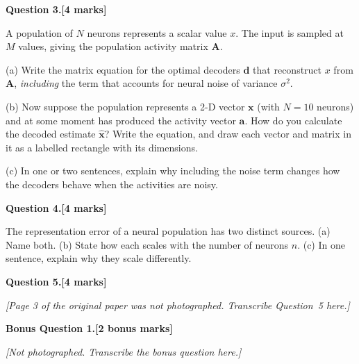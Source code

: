 \documentclass[11pt,letterpaper]{article}
\newcommand{\question}[2]{\par\vspace{10pt}\textbf{Question #1.}\hfill\textbf{[#2 marks]}\par}
\newcommand{\answerbox}[1]{\par\noindent\framebox[\linewidth]{\rule{0pt}{#1}}\par}
\begin{document}
\question{3}{4}
A population of $N$ neurons represents a scalar value $x$. The input is sampled at $M$ values, giving the population activity matrix $\mathbf{A}$.

(a) Write the matrix equation for the optimal decoders $\mathbf d$ that reconstruct $x$ from $\mathbf A$, \emph{including} the term that accounts for neural noise of variance $\sigma^2$.
\vspace{2.2cm}

(b) Now suppose the population represents a 2-D vector $\mathbf x$ (with $N = 10$ neurons) and at some moment has produced the activity vector $\mathbf a$. How do you calculate the decoded estimate $\hat{\mathbf x}$? Write the equation, and draw each vector and matrix in it as a labelled rectangle with its dimensions.
\answerbox{3.0cm}

(c) In one or two sentences, explain why including the noise term changes how the decoders behave when the activities are noisy.
\vspace{2.0cm}

\question{4}{4}
The representation error of a neural population has two distinct sources. (a) Name both. (b) State how each scales with the number of neurons $n$. (c) In one sentence, explain why they scale differently.
\vspace{3.2cm}

\newpage
\question{5}{4}
\textit{[Page 3 of the original paper was not photographed. Transcribe Question~5 here.]}
\vspace{7cm}

\textbf{Bonus Question 1.}\hfill\textbf{[2 bonus marks]}\par
\textit{[Not photographed. Transcribe the bonus question here.]}
\vspace{4cm}
\end{document}
